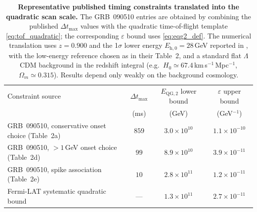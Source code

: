 \begin{table}[t]
\centering
\begin{tabular}{@{}lccc@{}}
\toprule
Constraint source & $\Delta t_{\max}$ & $E_{\mathrm{QG},2}$ lower bound & $\varepsilon$ upper bound \\
 & (ms) & (GeV) & (GeV$^{-1}$) \\
\midrule
GRB~090510, conservative onset choice (Table~2a) \cite{Abdo2009Nature} & $859$ & $3.0\times 10^{10}$ & $1.1\times 10^{-10}$ \\
GRB~090510, $>1$\,GeV onset choice (Table~2d) \cite{Abdo2009Nature} & $99$ & $8.9\times 10^{10}$ & $3.9\times 10^{-11}$ \\
GRB~090510, spike association (Table~2e) \cite{Abdo2009Nature} & $10$ & $2.8\times 10^{11}$ & $1.2\times 10^{-11}$ \\
Fermi-LAT systematic quadratic bound \cite{Vasileiou2013} & --- & $1.3\times 10^{11}$ & $2.7\times 10^{-11}$ \\
\bottomrule
\end{tabular}
\caption{\textbf{Representative published timing constraints translated into the quadratic scan scale.} The GRB~090510 entries are obtained by combining the published $\Delta t_{\max}$ values \cite{Abdo2009Nature} with the quadratic time-of-flight template \eqref{eq:tof_quadratic}; the corresponding $\varepsilon$ bound uses \eqref{eq:eqg2_def}. The numerical translation uses $z=0.900$ and the 1$\sigma$ lower energy $E_{\mathrm{h},0}=28$\,GeV reported in \cite{Abdo2009Nature}, with the low-energy reference chosen as in their Table~2, and a standard flat $\Lambda$CDM background in the redshift integral (e.g.\ $H_0\simeq 67.4$\,km\,s$^{-1}$\,Mpc$^{-1}$, $\Omega_m\simeq 0.315$). Results depend only weakly on the background cosmology.}
\label{tab:liv_quadratic_bounds}
\end{table}

